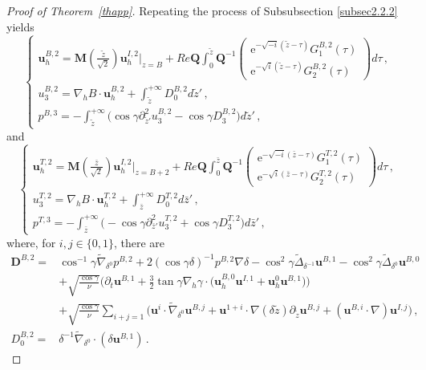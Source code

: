 \documentclass[pdflatex,sn-mathphys-num]{sn-jnl}%
\theoremstyle{thmstyleone}%
\theoremstyle{thmstyletwo}%
\theoremstyle{thmstylethree}%
\theoremstyle{thmstyletwo}
\begin{document}
\begin{proof}[Proof of Theorem~{\upshape\ref{thapp}}]
Repeating the process of Subsubsection \ref{subsec2.2.2} yields
\begin{equation}\label{2.32}
	\begin{cases}
		\boldsymbol u_h^{B,2}=
		\boldsymbol{M}(\tfrac{\tilde z}{\sqrt 2})
		\boldsymbol u_h^{I,2}|_{z=B}
		+
		Re\boldsymbol{Q}
		\int_0^{\tilde{z}}
		\boldsymbol{Q}^{-1}\begin{pmatrix}
			{\mathrm{e}}^{-\sqrt{-i}(\tilde{z}-\tau)} G^{B,2}_1(\tau)
			\\
			{\mathrm{e}}^{-\sqrt{i}(\tilde{z}-\tau)} G^{B,2}_2(\tau) 
		\end{pmatrix}{d}\tau\,,\\
		u_3^{B,2}=\nabla_{h}B\cdot\boldsymbol u_h^{B,2}+\int_{\tilde{z}}^{+\infty} D_0^{B,2}d\tilde{z}'\,,\\
		p^{B,3}=-\int_{\tilde{z}}^{+\infty}\big(
		\cos\gamma\partial_{\tilde{z}'}^2 u_3^{B,2}-\cos\gamma D_3^{B,2}
		\big)d\tilde{z}'\,,
	\end{cases}
\end{equation}
and
\begin{equation}\label{2.33}
	\begin{cases}
		\boldsymbol u_h^{T,2}=
		\boldsymbol{M}(\tfrac{\bar z}{\sqrt 2})
		\boldsymbol u_h^{I,2}|_{z=B+2}
		+
		Re\boldsymbol{Q}
		\int_0^{\bar{z}}
		\boldsymbol{Q}^{-1}\begin{pmatrix}
			{\mathrm{e}}^{-\sqrt{-i}(\bar{z}-\tau)} G^{T,2}_1(\tau) 
			\\
			{\mathrm{e}}^{-\sqrt{i}(\bar{z}-\tau)} G^{T,2}_2(\tau)
		\end{pmatrix} {d}\tau\,,\\	
		u_3^{T,2}=\nabla_{h}B\cdot\boldsymbol u_h^{T,2}+\int_{\bar{z}}^{+\infty} D_0^{T,2}d\bar{z}'\,,\\
		p^{T,3}=-\int_{\bar{z}}^{+\infty}\big(
		-\cos\gamma\partial_{\bar{z}'}^2 u_3^{T,2}+\cos\gamma D_3^{T,2}
		\big)d\bar{z}'\,,	
	\end{cases}
\end{equation}
where, for $i,j\in \{0,1\}$, there are
\begin{align*}
	\boldsymbol{D}^{B,2}
	=&\cos^{-1}\gamma\tilde{\nabla}_{\delta^0}p^{B,2}
	+2(\cos\gamma\delta)^{-1}p^{B,2}\nabla\delta
	-\cos^2\gamma\tilde{\Delta}_{\delta^{-1}}\boldsymbol u^{B,1}
	-\cos^2\gamma\tilde{\Delta}_{\delta^{0}}\boldsymbol{u}^{B,0}
	\\
	&
	+\sqrt{\tfrac{\cos\gamma}{\nu}}
	\Big(
	\partial_t\boldsymbol u^{B,1}
	+\tfrac{3}{2}\tan\gamma\nabla_{ h}\gamma\cdot
	\big(
	\boldsymbol{u}_h^{B,0} \boldsymbol{u}^{I,1}+\boldsymbol{u}^{0}_h \boldsymbol{u}^{B,1}
	\big)\Big)
	\\
	&+\sqrt{\tfrac{\cos\gamma}{\nu}}
	\sum_{i+j=1}\big(
	\boldsymbol{u}^{i}\cdot\tilde{\nabla}_{\delta^0}\boldsymbol{u}^{B,j}
	+\boldsymbol{u}^{1+i}\cdot\nabla(\delta\tilde{z})\partial_{\tilde{z}}\boldsymbol{u}^{B,j}+(\boldsymbol{u}^{B,i}\cdot\nabla)\boldsymbol{u}^{I,j}\big)\,,
	\\
	D^{B,2}_0=
	&\delta^{-1}\tilde{\nabla}_{\delta^0}\cdot(\delta\boldsymbol u^{B,1})\,.
\end{align*}







\end{proof}
\end{document}
